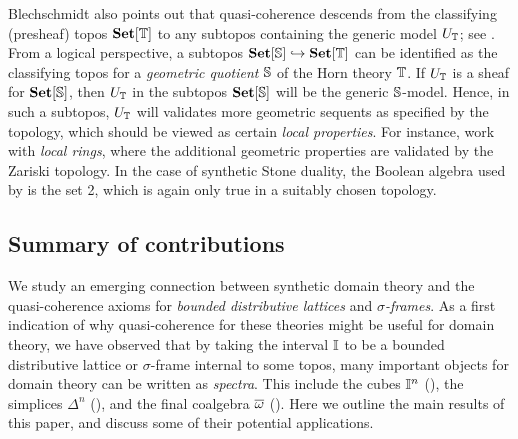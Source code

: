 Blechschmidt also points out that quasi-coherence descends from the classifying (presheaf) topos $\mathbf{Set}[\mathbb{T}]$ to any subtopos containing the generic model $U_{\mathbb{T}}$; see \citet[Cor. 7.7]{blechschmidt2020general}. From a logical perspective, a subtopos $\mathbf{Set}[\mathbb{S}] \hookrightarrow \mathbf{Set}[\mathbb{T}]$ can be identified as the classifying topos for a \emph{geometric quotient} $\mathbb{S}$ of the Horn theory $\mathbb{T}$. If $U_{\mathbb{T}}$ is a sheaf for $\mathbf{Set}[\mathbb{S}]$, then $U_{\mathbb{T}}$ in the subtopos $\mathbf{Set}[\mathbb{S}]$ will be the generic $\mathbb{S}$-model.
Hence, in such a subtopos, $U_{\mathbb{T}}$ will validates more geometric sequents as specified by the topology, which should be viewed as certain \emph{local properties}. For instance, \citet{blechschmidt2021using,Cherubini_Coquand_Hutzler_2024} work with \emph{local rings}, where the additional geometric properties are validated by the Zariski topology.
In the case of synthetic Stone duality, the Boolean algebra used by \citet{cherubini2024foundation} is the set 2, which is again only true in a suitably chosen topology.

\subsection{Summary of contributions}\label{sec:contributions}

We study an emerging connection between synthetic domain theory and the quasi-coherence axioms for \emph{bounded distributive lattices} and \emph{$\sigma$-frames}. As a first indication of why quasi-coherence for these theories might be useful for domain theory, we have observed that by taking the interval $\mathbb{I}$ to be a bounded distributive lattice or $\sigma$-frame internal to some topos,
many important objects for domain theory can be written as \emph{spectra}. This include the cubes $\mathbb{I}^n$ (), the simplices $\Delta^n$ (), and the final coalgebra $\overline{\omega}$ (). Here we outline the main results of this paper, and discuss some of their potential applications.

